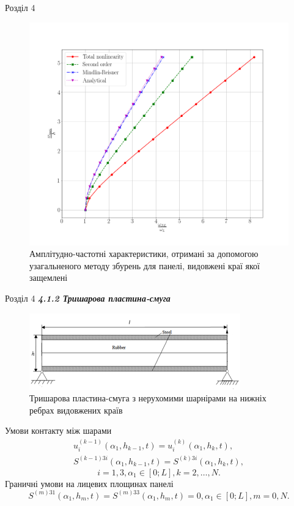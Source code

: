 \documentclass[8pt]{beamer}
\numberwithin{figure}{section}
\numberwithin{equation}{section}
\numberwithin{table}{section}
\begin{document}
\begin{frame}{Розділ 4}

\begin{figure}
	\includegraphics[scale=0.2]{pic/AFRC1.png}
		\caption{Амплітудно-частотні характеристики, отримані за допомогою узагальненого методу збурень для панелі, видовжені краї якої защемлені}
		\label{fig:AFR_C}
\end{figure}


\end{frame}

\begin{frame}{Розділ 4}
\textbf{\textit{4.1.2 Тришарова пластина-смуга}}

\begin{figure}
	\includegraphics[scale=0.5]{pic/plate3layers.png}
		\caption{Тришарова пластина-смуга з нерухомими шарнірами на нижніх ребрах видовжених країв}
\end{figure}

Умови контакту між шарами
\begin{gather}
u_i^{(k-1)}\left(\alpha_1, h_{k-1},t \right)=u_i^{(k)}\left(\alpha_1, h_{k},t \right),\\
S^{(k-1)3i}\left(\alpha_1, h_{k-1},t \right)=S^{(k)3i}\left(\alpha_1, h_{k},t \right),
\end{gather}
\[ i=1,3, \alpha_1 \in [0;L], k=2,\dots,N.\]
Граничні умови на лицевих площинах панелі
\begin{equation}
S^{(m)31}\left(\alpha_1, h_{m},t \right)=S^{(m)33}\left(\alpha_1, h_{m},t \right)=0,\alpha_1 \in [0;L], m=0,N.
\end{equation}

\end{frame}
\end{document}
